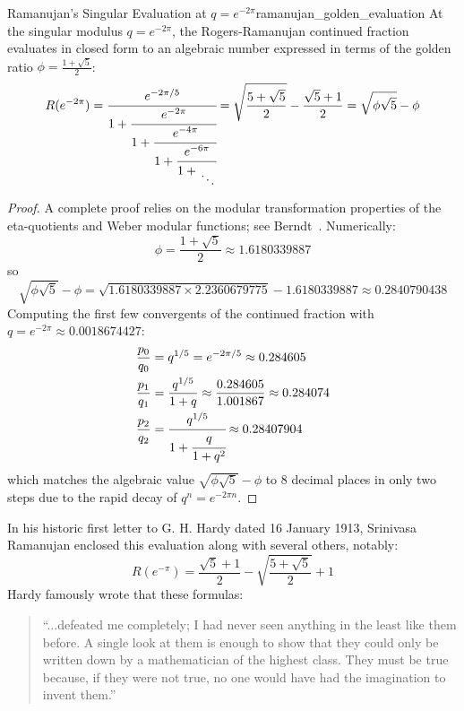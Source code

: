 \documentclass[a4paper]{article}
\begin{document}
\begin{mytheorem}{Ramanujan's Singular Evaluation at \texorpdfstring{$q = e^{-2\pi}$}{q = e^{-2pi}}}{ramanujan_golden_evaluation}
  At the singular modulus $q = e^{-2\pi}$, the Rogers-Ramanujan continued fraction evaluates in closed form to an algebraic number expressed in terms of the golden ratio $\phi = \frac{1+\sqrt{5}}{2}$:
  \[
    R(e^{-2\pi}) = \cfrac{e^{-2\pi/5}}{1 + \cfrac{e^{-2\pi}}{1 + \cfrac{e^{-4\pi}}{1 + \cfrac{e^{-6\pi}}{1 + \CFDots}}}} = \sqrt{\frac{5+\sqrt{5}}{2}} - \frac{\sqrt{5}+1}{2} = \sqrt{\phi\sqrt{5}} - \phi
  \]

  \begin{proof}
    A complete proof relies on the modular transformation properties of the eta-quotients and Weber modular functions; see Berndt~\cite{ramanujan1988}.
    Numerically:
    \[
      \phi = \frac{1+\sqrt{5}}{2} \approx 1.6180339887
    \]
    so
    \[
      \sqrt{\phi\sqrt{5}} - \phi = \sqrt{1.6180339887 \times 2.2360679775} - 1.6180339887 \approx 0.2840790438
    \]
    Computing the first few convergents of the continued fraction with $q = e^{-2\pi} \approx 0.0018674427$:
    \begin{align*}
      \frac{p_0}{q_0} & = q^{1/5} = e^{-2\pi/5} \approx 0.284605 \\
      \frac{p_1}{q_1} & = \frac{q^{1/5}}{1 + q} \approx \frac{0.284605}{1.001867} \approx 0.284074 \\
      \frac{p_2}{q_2} & = \cfrac{q^{1/5}}{1 + \cfrac{q}{1 + q^2}} \approx 0.28407904
    \end{align*}
    which matches the algebraic value $\sqrt{\phi\sqrt{5}} - \phi$ to 8 decimal places in only two steps due to the rapid decay of $q^n = e^{-2\pi n}$.
  \end{proof}
\end{mytheorem}

\begin{remark}
  In his historic first letter to G. H. Hardy dated 16 January 1913, Srinivasa Ramanujan enclosed this evaluation along with several others, notably:
  \[
    R(e^{-\pi}) = \frac{\sqrt{5}+1}{2} - \sqrt{\frac{5+\sqrt{5}}{2}} + 1
  \]
  Hardy famously wrote that these formulas:
  \begin{quote}
    ``...defeated me completely; I had never seen anything in the least like them before. A single look at them is enough to show that they could only be written down by a mathematician of the highest class. They must be true because, if they were not true, no one would have had the imagination to invent them.''
  \end{quote}
\end{remark}
\end{document}
